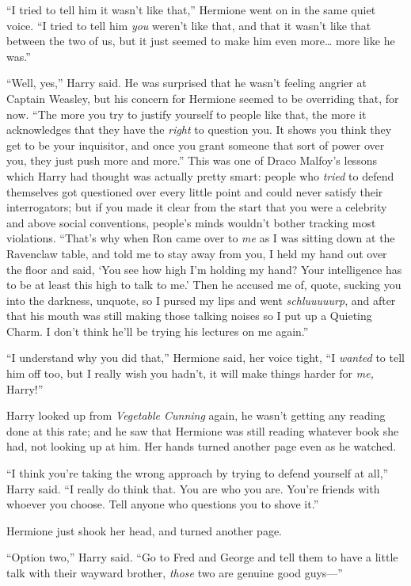 ``I tried to tell him it wasn't like that,'' Hermione went on in the
same quiet voice. ``I tried to tell him \emph{you} weren't like that,
and that it wasn't like that between the two of us, but it just seemed
to make him even more\ldots{} more like he was.''

``Well, yes,'' Harry said. He was surprised that he wasn't feeling
angrier at Captain Weasley, but his concern for Hermione seemed to be
overriding that, for now. ``The more you try to justify yourself to
people like that, the more it acknowledges that they have the
\emph{right} to question you. It shows you think they get to be your
inquisitor, and once you grant someone that sort of power over you, they
just push more and more.'' This was one of Draco Malfoy's lessons which
Harry had thought was actually pretty smart: people who \emph{tried} to
defend themselves got questioned over every little point and could never
satisfy their interrogators; but if you made it clear from the start
that you were a celebrity and above social conventions, people's minds
wouldn't bother tracking most violations. ``That's why when Ron came
over to \emph{me} as I was sitting down at the Ravenclaw table, and told
me to stay away from you, I held my hand out over the floor and said,
`You see how high I'm holding my hand? Your intelligence has to be at
least this high to talk to me.' Then he accused me of, quote, sucking
you into the darkness, unquote, so I pursed my lips and went
\emph{schluuuuurp}, and after that his mouth was still making those
talking noises so I put up a Quieting Charm. I don't think he'll be
trying his lectures on me again.''

``I understand why you did that,'' Hermione said, her voice tight, ``I
\emph{wanted} to tell him off too, but I really wish you hadn't, it will
make things harder for \emph{me,} Harry!''

Harry looked up from \emph{Vegetable Cunning} again, he wasn't getting
any reading done at this rate; and he saw that Hermione was still
reading whatever book she had, not looking up at him. Her hands turned
another page even as he watched.

``I think you're taking the wrong approach by trying to defend yourself
at all,'' Harry said. ``I really do think that. You are who you are.
You're friends with whoever you choose. Tell anyone who questions you to
shove it.''

Hermione just shook her head, and turned another page.

``Option two,'' Harry said. ``Go to Fred and George and tell them to
have a little talk with their wayward brother, \emph{those} two are
genuine good guys---''

